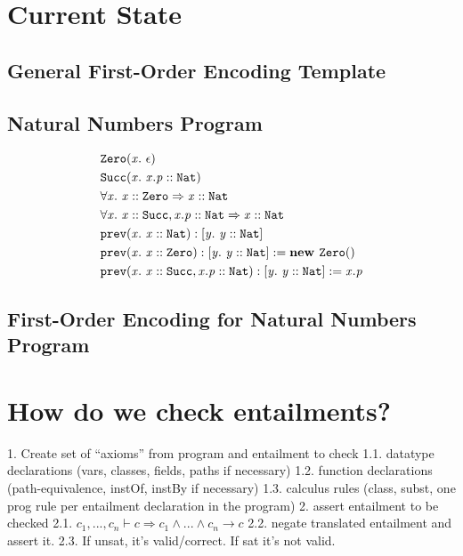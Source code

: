\documentclass[a4paper]{article}
\begin{document}

\section{Current State}
\subsection{General First-Order Encoding Template}


\subsection{Natural Numbers Program}
\begin{align}
&\mathit{\texttt{Zero}}(\mathit{x}.\ \mathit{\epsilon})\\
&\mathit{\texttt{Succ}}(\mathit{x}.\ \mathit{\mathit{x.p} :: \mathit{\texttt{Nat}}})\\
& \forall \mathit{x}.\ \mathit{\mathit{x} :: \mathit{\texttt{Zero}}} \Rightarrow \mathit{\mathit{x} :: \mathit{\texttt{Nat}}}\\
& \forall \mathit{x}.\ \mathit{\mathit{x} :: \mathit{\texttt{Succ}}, \mathit{x.p} :: \mathit{\texttt{Nat}}} \Rightarrow \mathit{\mathit{x} :: \mathit{\texttt{Nat}}}\\
&\mathit{\texttt{prev}}(\mathit{x}.\ \mathit{\mathit{x} :: \mathit{\texttt{Nat}}}): \mathit{[y.\ \mathit{\mathit{y} :: \mathit{\texttt{Nat}}}]}\\
&\mathit{\texttt{prev}}(\mathit{x}.\ \mathit{\mathit{x} :: \mathit{\texttt{Zero}}}): \mathit{[y.\ \mathit{\mathit{y} :: \mathit{\texttt{Nat}}}]} := \mathit{\textbf{new } \mathit{\texttt{Zero}}()}\\
&\mathit{\texttt{prev}}(\mathit{x}.\ \mathit{\mathit{x} :: \mathit{\texttt{Succ}}, \mathit{x.p} :: \mathit{\texttt{Nat}}}): \mathit{[y.\ \mathit{\mathit{y} :: \mathit{\texttt{Nat}}}]} := \mathit{x.p}
\end{align}

\subsection{First-Order Encoding for Natural Numbers Program}

\section{How do we check entailments?}
1. Create set of ``axioms'' from program and entailment to check
1.1. datatype declarations (vars, classes, fields, paths if necessary)
1.2. function declarations (path-equivalence, instOf, instBy if necessary)
1.3. calculus rules (class, subst, one prog rule per entailment declaration in the program)
2. assert entailment to be checked
2.1. $c_1,...,c_n \vdash c \Rightarrow c_1 \land ... \land c_n → c$
2.2. negate translated entailment and assert it.
2.3. If unsat, it's valid/correct. If sat it's not valid.
\end{document}
